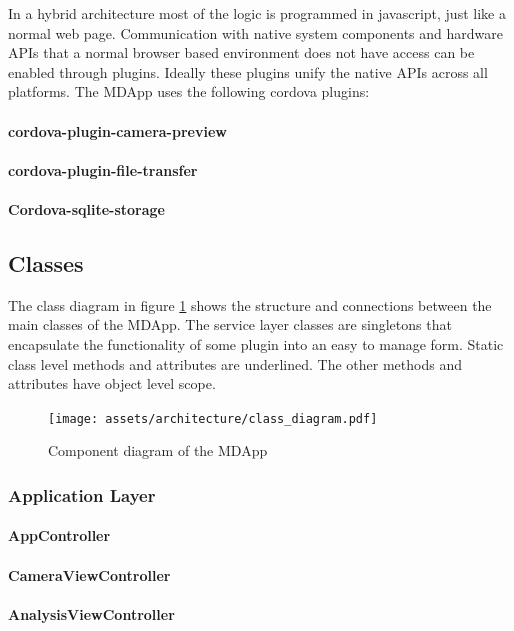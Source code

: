 In a hybrid architecture most of the logic is programmed in javascript, just like a normal web page. Communication with native system components and hardware APIs that a normal browser based environment does not have access can be enabled through plugins. Ideally these plugins unify the native APIs across all platforms. The MDApp uses the following cordova plugins:

   \paragraph{cordova-plugin-camera-preview}
   \paragraph{cordova-plugin-file-transfer}
   \paragraph{Cordova-sqlite-storage}

\subsection{Classes}

The class diagram in figure \ref{fig:class_dia} shows the structure and connections between the main classes of the MDApp. The service layer classes are singletons that encapsulate the functionality of some plugin into an easy to manage form. Static class level methods and attributes are underlined. The other methods and attributes have object level scope.

\begin{figure}[H]
    \centering
    \texttt{[image: assets/architecture/class\_diagram.pdf]}
    \caption{Component diagram of the MDApp}
    \label{fig:class_dia}
\end{figure}

    \subsubsection{Application Layer}
        \paragraph{AppController}
            
        \paragraph{CameraViewController}
            
        \paragraph{AnalysisViewController}
            


